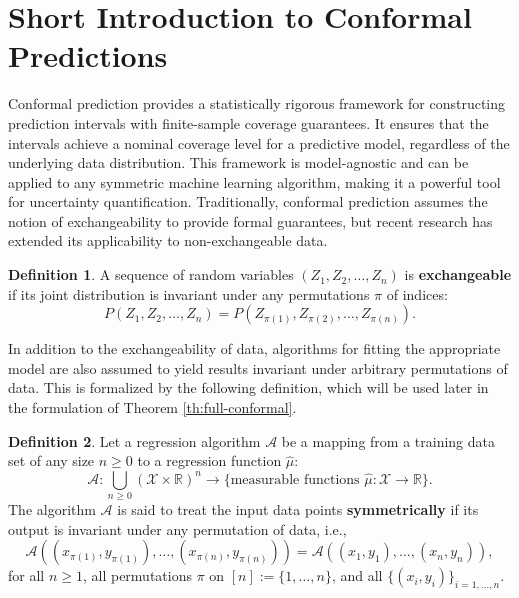 \documentclass{article}
\theoremstyle{definition}
\newtheorem{definition}{Definition}
\begin{document}
\section{Short Introduction to Conformal Predictions}

Conformal prediction provides a statistically rigorous framework for constructing prediction intervals with finite-sample coverage guarantees. It ensures that the intervals achieve a nominal coverage level for a predictive model, regardless of the underlying data distribution. This framework is model-agnostic and can be applied to any symmetric machine learning algorithm, making it a powerful tool for uncertainty quantification. Traditionally, conformal prediction assumes the notion of exchangeability to provide formal guarantees, but recent research has extended its applicability to non-exchangeable data.

\begin{definition}\label{def:exchangeability}
A sequence of random variables $(Z_1, Z_2, \dots, Z_n)$ is \textbf{exchangeable} if its joint distribution is invariant under any permutations $\pi$ of indices:
\begin{equation}\label{eq:exchangeability}
    P(Z_1, Z_2, \dots, Z_n) = P(Z_{\pi(1)}, Z_{\pi(2)}, \dots, Z_{\pi(n)}).
\end{equation}
\end{definition}
In addition to the exchangeability of data, algorithms for fitting the appropriate model are also assumed to yield results invariant under arbitrary permutations of data. This is formalized by the following definition, which will be used later in the formulation of Theorem \ref{th:full-conformal}.

\begin{definition}\label{def:symmetrical-algo}
Let a regression algorithm $\mathcal{A}$ be a mapping from a training data set of any size $n \geq 0$ to a regression function $\hat{\mu}$:
\[
\mathcal{A} : \bigcup_{n \geq 0} (\mathcal{X} \times \mathbb{R})^n \to \{\text{measurable functions } \hat{\mu} : \mathcal{X} \to \mathbb{R}\}.
\]
The algorithm $\mathcal{A}$ is said to treat the input data points \textbf{symmetrically} if its output is invariant under any permutation of data, i.e.,
\[
\mathcal{A}((x_{\pi(1)}, y_{\pi(1)}), \ldots, (x_{\pi(n)}, y_{\pi(n)})) = \mathcal{A}((x_1, y_1), \ldots, (x_n, y_n)),
\]
for all $n \geq 1$, all permutations $\pi$ on $[n] := \{1, \ldots, n\}$, and all $\{(x_i, y_i)\}_{i=1,\ldots,n}$.
\end{definition}
\end{document}
